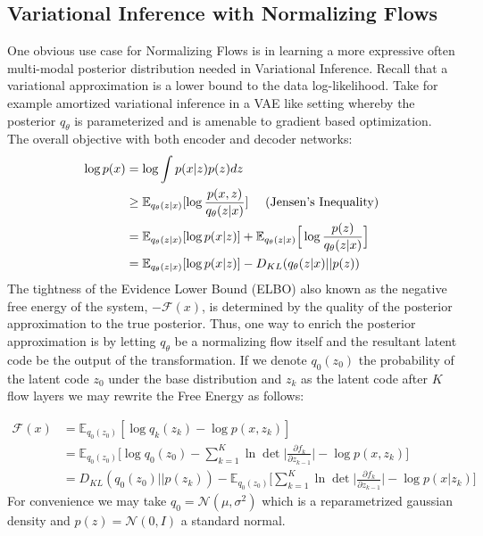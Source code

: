 \subsection{Variational Inference with Normalizing Flows}
One obvious use case for Normalizing Flows is in learning a more expressive often multi-modal posterior distribution needed in Variational Inference. Recall that a variational approximation is a lower bound to the data log-likelihood. Take for example amortized variational inference in a VAE like setting whereby the posterior $q_{\theta}$ is parameterized and is amenable to gradient based optimization. The overall objective with both encoder and decoder networks:
\begin{align}
    \log p(x) & = \log \int p(x|z)p(z) dz \\
              & \geq \mathbb{E}_{q_{\theta}(z|x)}[\log \frac{p(x,z)}{q_{\theta}(z|x)}] \ \ \ \  (\textnormal{Jensen's Inequality}) \\
              & = \mathbb{E}_{q_{\theta}(z|x)} [\log p(x|z)] + \mathbb{E}_{q_{\theta}(z|x)}\Big[\log \frac{p(z)}{q_{\theta}(z|x)}\Big] \\
              & = \mathbb{E}_{q_{\theta}(z|x)} [\log p(x|z)] - D_{KL}(q_{\theta}(z|x) || p(z)) \label{nn_vae_perspective}
\end{align}
The tightness of the Evidence Lower Bound (ELBO) also known as the negative free energy of the system, $-\mathcal{F}(x)$, is determined by the quality of the posterior approximation to the true posterior. Thus, one way to enrich the posterior approximation is by letting $q_{\theta}$ be a normalizing flow itself and the resultant latent code be the output of the transformation. If we denote $q_0(z_0)$ the probability of the latent code $z_0$ under the base distribution and $z_k$ as the latent code after $K$ flow layers we may rewrite the Free Energy as follows:

\begin{align}
    \mathcal{F}(x) &= \mathbb{E}_{q_{0}(z_0)}[\log q_k(z_k) - \log p(x,z_k)] \\
    &= \mathbb{E}_{q_{0}(z_0)}\Big[\log q_0(z_0) - \sum_{k=1}^K\ln \det \Big \lvert \frac{\partial f_k}{\partial z_{k-1}} \Big \rvert - \log p(x,z_k)\Big]\\
    &= D_{KL}(q_0(z_0)|| p(z_k)) - \mathbb{E}_{q_{0}(z_0)}\Big[\sum_{k=1}^K\ln \det \Big \lvert \frac{\partial f_k}{\partial z_{k-1}} \Big \rvert - \log p(x|z_k)\Big]
\end{align}
For convenience we may take $q_0 = \mathcal{N}(\mu, \sigma^2)$ which is a reparametrized gaussian density and $p(z) = \mathcal{N}(0, I)$ a standard normal. 

